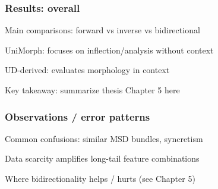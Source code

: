 
\begin{frame}
    \frametitle{Results: overall}
    \begin{PraesentationAufzaehlung}
        \item Main comparisons: forward vs inverse vs bidirectional
        \item UniMorph: focuses on inflection/analysis without context
        \item UD-derived: evaluates morphology in context
        \item Key takeaway: summarize thesis Chapter 5 here
    \end{PraesentationAufzaehlung}
\end{frame}

\begin{frame}
    \frametitle{Observations / error patterns}
    \begin{PraesentationAufzaehlung}
        \item Common confusions: similar MSD bundles, syncretism
        \item Data scarcity amplifies long-tail feature combinations
        \item Where bidirectionality helps / hurts (see Chapter 5)
    \end{PraesentationAufzaehlung}
\end{frame}
